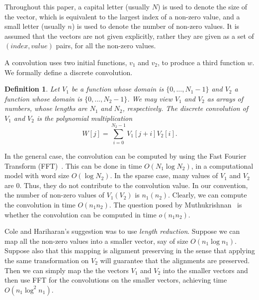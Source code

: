 \documentclass[11pt,amssymb]{article}
\newtheorem{definition}{Definition}
\begin{document}
Throughout this paper, a capital letter (usually $N$) is used to
denote the size of the vector, which is equivalent to the largest
index of a non-zero value, and a small letter (usually $n$) is used
to denote the number of non-zero values. It is assumed that the
vectors are not given explicitly, rather they are given as a set of
$(index,value)$ pairs, for all the non-zero values.

A convolution uses two initial functions, $v_1$ and $v_2$, to
produce a third function $w$. We formally define a discrete
convolution.
\begin{definition}
Let $V_1$ be a function whose domain is $\{ 0,..., N_1-1\}$ and $V_2$
a function whose domain is $\{ 0,..., N_2-1 \}$. We may view $V_1$ and
$V_2$ as arrays of numbers, whose lengths are $N_1$ and $N_2$,
respectively. The {\em discrete convolution of $V_1$ and $V_2$} is the
polynomial multiplication
$$ W[j] = \sum_{i=0}^{N_2-1} V_1[j+i] V_2[i].$$
\end{definition}

In the general case, the convolution can be computed by using the Fast
Fourier Transform (FFT)~\cite{CLR-92}. This can be done in time
$O(N_1\log N_2)$, in a computational model with word size $O(\log
N_2)$. In the sparse case, many values of $V_1$ and $V_2$ are
$0$. Thus, they do not contribute to the convolution value. In our
convention, the number of non-zero values of $V_1 (V_2)$ is $n_1
(n_2)$. Clearly, we can compute the convolution in time
$O(n_1n_2)$. The question posed by Muthukrishnan~\cite{muthu-open} is
whether the convolution can be computed in time $o(n_1n_2)$.

Cole and Hariharan's suggestion was to use {\em length reduction}.
Suppose we can map all the non-zero values into a smaller vector, say
of size $O(n_1 \log n_1)$. Suppose also that this mapping is alignment
preserving in the sense that applying the same transformation on $V_2$
will guarantee that the alignments are preserved. Then we can simply
map the the vectors $V_1$ and $V_2$ into the smaller vectors and then
use FFT for the convolutions on the smaller vectors, achieving time
$O(n_1 \log^2 n_1)$.
\end{document}
